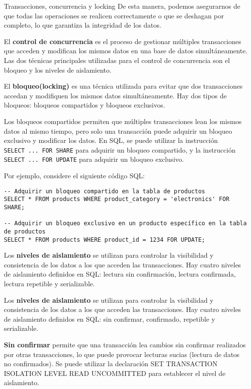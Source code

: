 \begin{frame}[fragile]{Transacciones, concurrencia y locking}
De esta manera, podemos asegurarnos de que todas las operaciones se
realicen correctamente o que se deshagan por completo, lo que garantiza
la integridad de los datos.

El \textbf{control de concurrencia} es el proceso de gestionar múltiples
transacciones que acceden y modifican los mismos datos en una base de
datos simultáneamente. Las dos técnicas principales utilizadas para el
control de concurrencia son el bloqueo y los niveles de aislamiento.

El \textbf{bloqueo(locking)} es una técnica utilizada para evitar que
dos transacciones accedan y modifiquen los mismos datos simultáneamente.
Hay dos tipos de bloqueos: bloqueos compartidos y bloqueos exclusivos.

Los bloqueos compartidos permiten que múltiples transacciones lean los
mismos datos al mismo tiempo, pero solo una transacción puede adquirir
un bloqueo exclusivo y modificar los datos. En SQL, se puede utilizar la
instrucción \texttt{SELECT\ ...\ FOR\ SHARE} para adquirir un bloqueo
compartido, y la instrucción \texttt{SELECT\ ...\ FOR\ UPDATE} para
adquirir un bloqueo exclusivo.

Por ejemplo, considere el siguiente código SQL:

\begin{verbatim}
-- Adquirir un bloqueo compartido en la tabla de productos
SELECT * FROM products WHERE product_category = 'electronics' FOR SHARE;

-- Adquirir un bloqueo exclusivo en un producto específico en la tabla de productos
SELECT * FROM products WHERE product_id = 1234 FOR UPDATE;
\end{verbatim}

Los \textbf{niveles de aislamiento} se utilizan para controlar la
visibilidad y consistencia de los datos a los que acceden las
transacciones. Hay cuatro niveles de aislamiento definidos en SQL:
lectura sin confirmación, lectura confirmada, lectura repetible y
serializable.

Los \textbf{niveles de aislamiento} se utilizan para controlar la
visibilidad y consistencia de los datos a los que acceden las
transacciones. Hay cuatro niveles de aislamiento definidos en SQL: sin
confirmar, confirmado, repetible y serializable.

\textbf{Sin confirmar} permite que una transacción lea cambios sin
confirmar realizados por otras transacciones, lo que puede provocar
lecturas sucias (lectura de datos no confirmados). Se puede utilizar la
declaración SET TRANSACTION ISOLATION LEVEL READ UNCOMMITTED para
establecer el nivel de aislamiento.


\end{frame}
